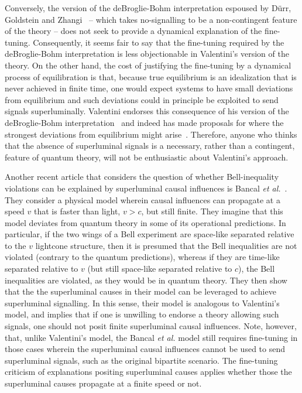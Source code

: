 \documentclass[letterpaper,onecolumn,nofootinbib]{revtex4}
\begin{document}
Conversely, the version of the deBroglie-Bohm interpretation espoused by D\"{u}rr, Goldstein and Zhangi~\cite{Durr1992}  -- which takes no-signalling to be a non-contingent feature of the theory -- does not seek to provide a dynamical explanation of the fine-tuning. Consequently, it seems fair to say that the fine-tuning required by the deBroglie-Bohm interpretation is less objectionable in Valentini's version of the theory. On the other hand, the cost of  justifying the fine-tuning by a dynamical process of equilibration is that, because true equilibrium is an idealization that is never achieved in finite time, one would expect systems to have small deviations from equilibrium and such deviations could in principle be exploited to send signals superluminally.  Valentini endorses this consequence of his version of the deBroglie-Bohm interpretation~\cite{Valentini2002} and indeed has made proposals for where the strongest deviations from equilibrium might arise~\cite{Valentini2004}.  Therefore, anyone who thinks that the absence of superluminal signals is a necessary, rather than a contingent, feature of quantum theory, will not be enthusiastic about Valentini's approach.

Another recent article that considers the question of whether Bell-inequality violations can be explained by superluminal causal influences is Bancal {\it et al.}~\cite{Bancal2012}.  They consider a physical model wherein causal influences can propagate at a speed $v$ that is faster than light, $v >c$, but still finite.  They imagine that this model deviates from quantum theory in some of its operational predictions.   In particular, if the two wings of a Bell experiment are space-like separated relative to the $v$ lightcone structure, then it is presumed that the Bell inequalities are not violated (contrary to the quantum predictions), whereas if they are time-like separated relative to $v$ (but still space-like separated relative to $c$), the Bell inequalities are violated, as they would be in quantum theory.  They then show that the the superluminal causes in their model can be leveraged to achieve superluminal signalling.  In this sense, their model is analogous to Valentini's model, and implies that if one is unwilling to endorse a theory allowing such signals, one should not posit finite superluminal causal influences.  Note, however, that, unlike Valentini's model, the Bancal {\it et al.} model still requires fine-tuning in those cases wherein the superluminal causal influences cannot be used to send superluminal signals, such as the original bipartite scenario.  The fine-tuning criticism of explanations positing superluminal causes applies whether those the superluminal causes propagate at a finite speed or not.
\end{document}
